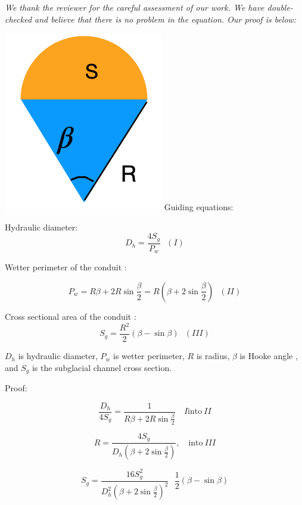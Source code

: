 \documentclass[11pt]{article}
\begin{document}
\begin{itemize}
  \textit{We thank the reviewer for the careful assessment of our work. We have double-checked and believe that there is no problem in the equation. Our proof is below:}

   \includegraphics[width=0.3\linewidth]{Hooke.png}
  Guiding equations:

  Hydraulic diameter:
  \begin{equation}
    D_h = \frac{4S_g}{P_w}~~~(I)
  \end{equation}

  Wetter perimeter of the conduit \citep[][pg. 69]{hooke1990}:
  
  \begin{equation}
    P_w = R \beta +2R \sin\frac{\beta}{2}= R(\beta +2\sin \frac{\beta}{2}) ~~~(II)
  \end{equation}


  Cross sectional area of the conduit \citep[][pg. 69]{hooke1990}:
  \begin{equation}
    S_g=\frac{R^2}{2}(\beta - \sin \beta)~~~(III)
  \end{equation}

  $D_h$ is hydraulic diameter, $P_w$ is wetter perimeter, $R$ is radius, $\beta$ is Hooke angle \citep{hooke1990}, and $S_g$ is the subglacial channel cross section.

  Proof:
  
  \begin{linenomath*}
    \begin{equation}
      \frac{D_h}{4S_g} = \frac{1}{R\beta + 2R\sin\frac{\beta}{2}} \quad I \mathrm{into~} II 
    \end{equation}
  \end{linenomath*}

  \begin{equation}
    R = \frac{4S_g}{D_h (\beta +2 \sin \frac{\beta}{2})}, \quad \mathrm{into~} III 
  \end{equation}

  
  \begin{equation}
    S_g = \frac{16 S_g^2}{D_h^2 (\beta +2\sin\frac{\beta}{2})^2} ~~~\frac{1}{2}(\beta-\sin\beta)
  \end{equation}


\end{itemize}
\end{document}

